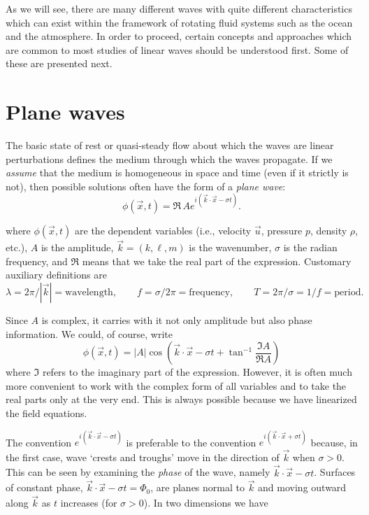 As we will see, there are many different waves with quite different characteristics which
can exist within the framework of rotating fluid systems such as the ocean and the
atmosphere. In order to proceed, certain concepts and approaches which are common to
most studies of linear waves should be understood first. Some of these are presented
next.

\section{Plane waves}

The basic state of rest or quasi-steady flow about which the waves are linear
perturbations defines the medium through which the waves propagate. If we \emph{assume}
that the medium is homogeneous in space and time (even if it strictly is not), then
possible solutions often have the form of a \emph{plane wave}:
\[
	\phi(\vec{x},t)=\Re\,A e^{i(\vec{k}\cdot\vec{x}-\sigma t)}.
\]

\sourcepagebreak

where $\phi(\vec{x},t)$ are the dependent variables (i.e., velocity $\vec{u}$, pressure
$p$, density $\rho$, etc.), $A$ is the amplitude, $\vec{k}=(k,\ell,m)$ is the
wavenumber, $\sigma$ is the radian frequency, and $\Re$ means that we take the real
part of the expression. Customary auxiliary definitions are
\[
	\lambda=2\pi/|\vec{k}|=\text{wavelength},\qquad
	f=\sigma/2\pi=\text{frequency},\qquad
	T=2\pi/\sigma=1/f=\text{period}.
\]

Since $A$ is complex, it carries with it not only amplitude but also phase information.
We could, of course, write
\[
	\phi(\vec{x},t)=|A|\cos\left(\vec{k}\cdot\vec{x}-\sigma t
	+\tan^{-1}\frac{\Im A}{\Re A}\right)
\]
where $\Im$ refers to the imaginary part of the expression. However, it is often much
more convenient to work with the complex form of all variables and to take the real
parts only at the very end. This is always possible because we have linearized the field
equations.

The convention $e^{i(\vec{k}\cdot\vec{x}-\sigma t)}$ is preferable to the convention
$e^{i(\vec{k}\cdot\vec{x}+\sigma t)}$ because, in the first case, wave `crests and
troughs' move in the direction of $\vec{k}$ when $\sigma>0$. This can be seen by
examining the \emph{phase} of the wave, namely $\vec{k}\cdot\vec{x}-\sigma t$.
Surfaces of constant phase, $\vec{k}\cdot\vec{x}-\sigma t=\Phi_0$, are planes normal
to $\vec{k}$ and moving outward along $\vec{k}$ as $t$ increases (for $\sigma>0$).
In two dimensions we have

